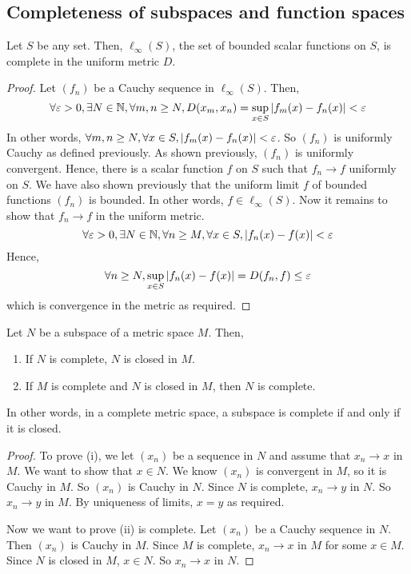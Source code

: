 \subsection{Completeness of subspaces and function spaces}
\begin{theorem}
	Let \( S \) be any set.
	Then, \( \ell_\infty(S) \), the set of bounded scalar functions on \( S \), is complete in the uniform metric \( D \).
\end{theorem}
\begin{proof}
	Let \( (f_n) \) be a Cauchy sequence in \( \ell_\infty(S) \).
	Then,
	\[
		\forall \varepsilon > 0, \exists N \in \mathbb N, \forall m,n \geq N, D(x_m, x_n) = \sup_{x \in S} \abs{f_m(x) - f_n(x)} < \varepsilon
	\]
	In other words, \( \forall m,n \geq N, \forall x \in S, \abs{f_m(x) - f_n(x)} < \varepsilon \).
	So \( (f_n) \) is uniformly Cauchy as defined previously.
	As shown previously, \( (f_n) \) is uniformly convergent.
	Hence, there is a scalar function \( f \) on \( S \) such that \( f_n \to f \) uniformly on \( S \).
	We have also shown previously that the uniform limit \( f \) of bounded functions \( (f_n) \) is bounded.
	In other words, \( f \in \ell_\infty(S) \).
	Now it remains to show that \( f_n \to f \) in the uniform metric.
	\[
		\forall \varepsilon > 0, \exists N \in \mathbb N, \forall n \geq M, \forall x \in S, \abs{f_n(x) - f(x)} < \varepsilon
	\]
	Hence,
	\[
		\forall n \geq N, \sup_{x \in S} \abs{f_n(x) - f(x)} = D(f_n,f) \leq \varepsilon
	\]
	which is convergence in the metric as required.
\end{proof}
\begin{proposition}
	Let \( N \) be a subspace of a metric space \( M \).
	Then,
	\begin{enumerate}
		\item If \( N \) is complete, \( N \) is closed in \( M \).
		\item If \( M \) is complete and \( N \) is closed in \( M \), then \( N \) is complete.
	\end{enumerate}
	In other words, in a complete metric space, a subspace is complete if and only if it is closed.
\end{proposition}
\begin{proof}
	To prove (i), we let \( (x_n) \) be a sequence in \( N \) and assume that \( x_n \to x \) in \( M \).
	We want to show that \( x \in N \).
	We know \( (x_n) \) is convergent in \( M \), so it is Cauchy in \( M \).
	So \( (x_n) \) is Cauchy in \( N \).
	Since \( N \) is complete, \( x_n \to y \) in \( N \).
	So \( x_n \to y \) in \( M \).
	By uniqueness of limits, \( x = y \) as required.

	Now we want to prove (ii) is complete.
	Let \( (x_n) \) be a Cauchy sequence in \( N \).
	Then \( (x_n) \) is Cauchy in \( M \).
	Since \( M \) is complete, \( x_n \to x \) in \( M \) for some \( x \in M \).
	Since \( N \) is closed in \( M \), \( x \in N \).
	So \( x_n \to x \) in \( N \).
\end{proof}
